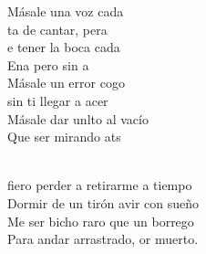 \documentclass[12pt]{article}
\begin{document}
\begin{multicols*}{2}
\begin{cancion}
	\begin{chorus}%
	Másale una voz cada\\
	ta de cantar, pera\\
	e tener la boca cada\\
	Ena pero sin a\\
	Másale un error cogo\\
	 sin ti llegar a acer\\
	Másale dar unlto al vacío  \\
	Que ser mirando ats\\
	\end{chorus}%
	\jump\\
	fiero perder a retirarme a tiempo\\
	Dormir de un tirón avir con sueño\\
	Me ser bicho raro que un borrego\\
	Para andar arrastrado, or muerto.\\
\end{cancion}%


\end{multicols*}
\end{document}
